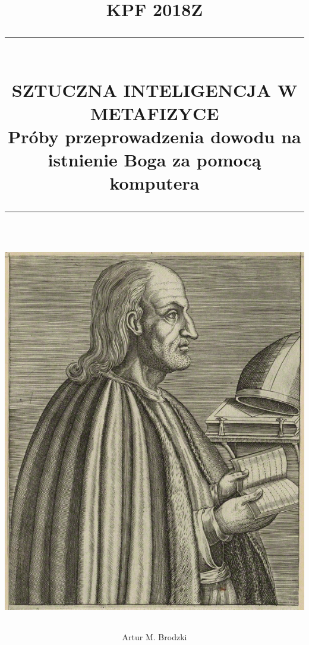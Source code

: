 \documentclass[12pt]{article}
\newcommand{\HRule}[1]{\rule{\linewidth}{#1}}
\begin{document}
\title{ \textsc{KPF 2018Z}
		\\ %
		\HRule{0.5pt} \\
		\LARGE \textbf{\uppercase{
		    Sztuczna inteligencja w metafizyce} \\ 
	    \normalsize Próby przeprowadzenia dowodu na istnienie Boga za pomocą komputera }
		\HRule{2pt} \\ [0.5cm]
		\includegraphics[width=0.5\linewidth]{anzelm.png}
		}


\author{Artur M. Brodzki }


\maketitle
\newpage
{}

\renewcommand\tablename{Tabela}

\newtheorem{theorem}{Twierdzenie}
\newtheorem{definition}{Definicja}
\newtheorem{axiom}{Aksjomat}
\newtheorem{axiom-g}{Aksjomat}
\newtheorem{definition-g}{Definicja}
\newtheorem{theorem-g}{Twierdzenie}
\newtheorem{lemma}{Lemat}
\newtheorem{corollary}{Fakt}

\sectionfont{\scshape}
\end{document}
